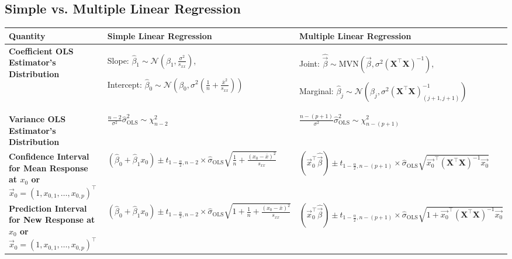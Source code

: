 \documentclass[12pt,oneside]{article}
\newcommand{\OLS}{\text{OLS}}
\newcommand{\N}{\mathcal{N}}
\newcommand{\MVN}{\text{MVN}}
\theoremstyle{definition}
\theoremstyle{remark}
\begin{document}
\subsection{Simple vs. Multiple Linear Regression}

\begin{center}
{
\scriptsize
\renewcommand{\arraystretch}{1.5}
\begin{tabular}{p{3.25cm}|p{6cm}|p{6cm}}
\textbf{Quantity} & \textbf{Simple Linear Regression} & \textbf{Multiple Linear Regression} \\ \hline

\textbf{Coefficient OLS Estimator's Distribution}
& Slope: $\hat{\beta}_{1} \sim \N \left( \beta_1, \frac{\sigma^2}{s_{xx}} \right)$, 

Intercept: $\hat{\beta}_{0} \sim \N \left( \beta_0, \sigma^2 \left( \frac{1}{n} + \frac{\bar{x}^2}{s_{xx}} \right) \right)$
& Joint: $\widehat{\vec{\beta}} \sim \MVN \left( \vec{\beta}, \sigma^2 (\boldsymbol{X}^{\top} \boldsymbol{X})^{-1} \right)$, 

Marginal: $\hat{\beta}_j \sim \N \left( \beta_j, \sigma^2 (\boldsymbol{X}^{\top} \boldsymbol{X})^{-1}_{(j + 1, j + 1)} \right)$ \\

\hline

\textbf{Variance OLS Estimator's Distribution}
& $\frac{n - 2}{\sigma^2} \hat{\sigma}^2_{\OLS} \sim \chi^2_{n - 2}$
& $\frac{n - (p + 1)}{\sigma^2} \hat{\sigma}^2_{\OLS} \sim \chi^2_{n - (p + 1)}$ \\

\hline

\textbf{Confidence Interval for Mean Response at $x_0$ or $\vec{x}_0 = (1, x_{0, 1}, \ldots, x_{0, p})^{\top}$}
& $(\hat{\beta}_{0} + \hat{\beta}_{1} x_0) \pm t_{1 - \frac{\alpha}{2}, n - 2} \times \hat{\sigma}_{\OLS} \sqrt{\frac{1}{n} + \frac{(x_0 - \bar{x})^2}{s_{xx}}}$
& $(\vec{x}_0^{\top} \widehat{\vec{\beta}}) \pm t_{1 - \frac{\alpha}{2}, n - (p + 1)} \times \hat{\sigma}_{\OLS} \sqrt{\vec{x_0}^{\top} (\boldsymbol{X}^{\top} \boldsymbol{X})^{-1} \vec{x_0}}$ \\
\hline

\textbf{Prediction Interval for New Response at $x_0$ or $\vec{x}_0 = (1, x_{0, 1}, \ldots, x_{0, p})^{\top}$}
& $(\hat{\beta}_{0} + \hat{\beta}_{1} x_0) \pm t_{1 - \frac{\alpha}{2}, n - 2} \times \hat{\sigma}_{\OLS} \sqrt{1 + \frac{1}{n} + \frac{(x_0 - \bar{x})^2}{s_{xx}}}$
& $(\vec{x}_0^{\top} \widehat{\vec{\beta}}) \pm t_{1 - \frac{\alpha}{2}, n - (p + 1)} \times \hat{\sigma}_{\OLS} \sqrt{1 + \vec{x_0}^{\top} (\boldsymbol{X}^{\top} \boldsymbol{X})^{-1} \vec{x_0}}$
\end{tabular}
}
\end{center}
\end{document}
